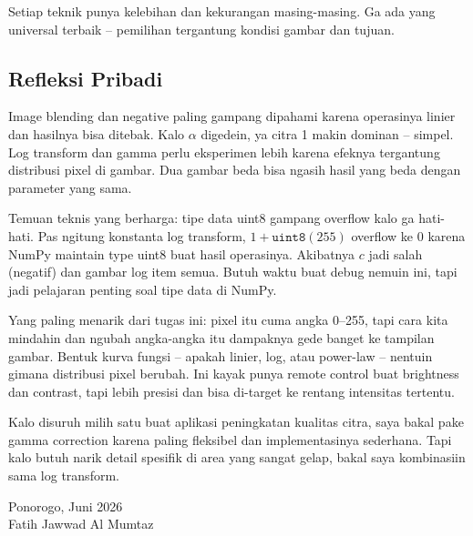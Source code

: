 \documentclass[11pt,a4paper]{article}
\begin{document}
Setiap teknik punya kelebihan dan kekurangan masing-masing. Ga ada yang universal terbaik -- pemilihan tergantung kondisi gambar dan tujuan.

\subsection{Refleksi Pribadi}

Image blending dan negative paling gampang dipahami karena operasinya linier dan hasilnya bisa ditebak. Kalo $\alpha$ digedein, ya citra 1 makin dominan -- simpel. Log transform dan gamma perlu eksperimen lebih karena efeknya tergantung distribusi pixel di gambar. Dua gambar beda bisa ngasih hasil yang beda dengan parameter yang sama.

Temuan teknis yang berharga: tipe data uint8 gampang overflow kalo ga hati-hati. Pas ngitung konstanta log transform, $1 + \texttt{uint8}(255)$ overflow ke 0 karena NumPy maintain type uint8 buat hasil operasinya. Akibatnya $c$ jadi salah (negatif) dan gambar log item semua. Butuh waktu buat debug nemuin ini, tapi jadi pelajaran penting soal tipe data di NumPy.

Yang paling menarik dari tugas ini: pixel itu cuma angka 0--255, tapi cara kita mindahin dan ngubah angka-angka itu dampaknya gede banget ke tampilan gambar. Bentuk kurva fungsi -- apakah linier, log, atau power-law -- nentuin gimana distribusi pixel berubah. Ini kayak punya remote control buat brightness dan contrast, tapi lebih presisi dan bisa di-target ke rentang intensitas tertentu.

Kalo disuruh milih satu buat aplikasi peningkatan kualitas citra, saya bakal pake gamma correction karena paling fleksibel dan implementasinya sederhana. Tapi kalo butuh narik detail spesifik di area yang sangat gelap, bakal saya kombinasiin sama log transform.

\begin{flushright}
Ponorogo, Juni 2026\\[4pt]
Fatih Jawwad Al Mumtaz
\end{flushright}
\end{document}
